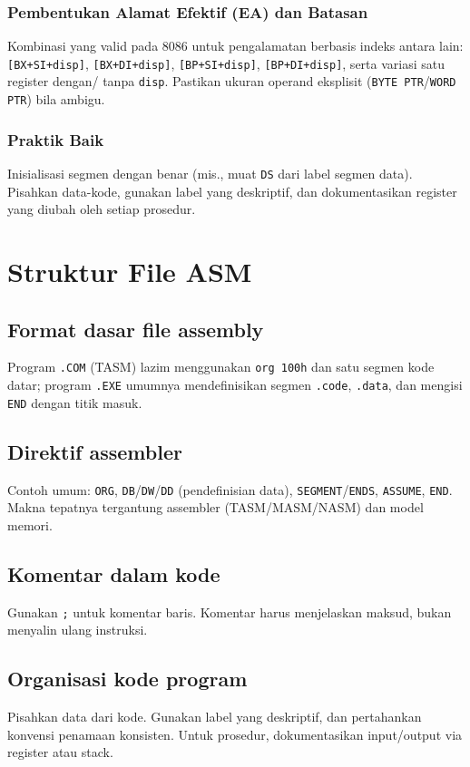 \subsubsection{Pembentukan Alamat Efektif (EA) dan Batasan}
Kombinasi yang valid pada 8086 untuk pengalamatan berbasis indeks antara lain: \texttt{[BX+SI+disp]}, \texttt{[BX+DI+disp]}, \texttt{[BP+SI+disp]}, \texttt{[BP+DI+disp]}, serta variasi satu register dengan/ tanpa \texttt{disp}. Pastikan ukuran operand eksplisit (\texttt{BYTE PTR}/\texttt{WORD PTR}) bila ambigu. \cite{intel2019manual32}

\subsubsection{Praktik Baik}
Inisialisasi segmen dengan benar (mis., muat \texttt{DS} dari label segmen data). Pisahkan data-kode, gunakan label yang deskriptif, dan dokumentasikan register yang diubah oleh setiap prosedur.

\section{Struktur File ASM}
\subsection{Format dasar file assembly}
Program \texttt{.COM} (TASM) lazim menggunakan \texttt{org 100h} dan satu segmen kode datar; program \texttt{.EXE} umumnya mendefinisikan segmen \texttt{.code}, \texttt{.data}, dan mengisi \texttt{END} dengan titik masuk.

\subsection{Direktif assembler}
Contoh umum: \texttt{ORG}, \texttt{DB}/\texttt{DW}/\texttt{DD} (pendefinisian data), \texttt{SEGMENT}/\texttt{ENDS}, \texttt{ASSUME}, \texttt{END}. Makna tepatnya tergantung assembler (TASM/MASM/NASM) dan model memori.

\subsection{Komentar dalam kode}
Gunakan \texttt{;} untuk komentar baris. Komentar harus menjelaskan maksud, bukan menyalin ulang instruksi.

\subsection{Organisasi kode program}
Pisahkan data dari kode. Gunakan label yang deskriptif, dan pertahankan konvensi penamaan konsisten. Untuk prosedur, dokumentasikan input/output via register atau stack.

